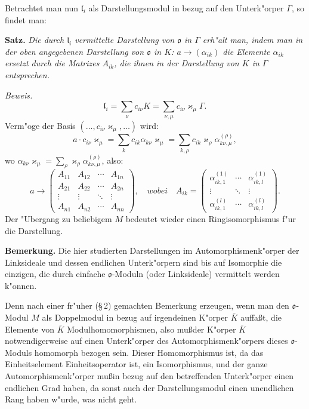 \documentclass[12pt,a4paper]{article}
\theoremstyle{plain}
\begin{document}
Betrachtet man nun $\mathfrak{l}_i$ als Darstellungsmodul in bezug auf den Unterk"orper $\Gamma$, so findet man:

\noindent\textbf{Satz.}
\textit{Die durch $\mathfrak{l}_i$ vermittelte Darstellung von $\mathfrak{o}$ in $\Gamma$ erh"alt man, indem man in der oben angegebenen Darstellung von $\mathfrak{o}$ in $K$: $a \to (\alpha_{ik})$ die Elemente $\alpha_{ik}$ ersetzt durch die Matrizes $A_{ik}$, die ihnen in der Darstellung von $K$ in $\Gamma$ entsprechen.}

\noindent\textit{Beweis.}
\[
\mathfrak{l}_i = \sum_\nu c_{i\nu}K = \sum_{\nu,\mu} c_{i\nu}\varkappa_\mu\Gamma.
\]
Verm"oge der Basis $(\ldots,c_{i\nu}\varkappa_\mu,\ldots)$ wird:
\[
a \cdot c_{i\nu}\varkappa_\mu = \sum_k c_{ik}\alpha_{k\nu}\varkappa_\mu
= \sum_{k,\rho} c_{ik}\varkappa_\rho\alpha^{(\rho)}_{k\nu,\mu},
\]
wo $\alpha_{k\nu}\varkappa_\mu = \sum_\rho \varkappa_\rho\alpha^{(\rho)}_{k\nu,\mu}$, also:
\[
a \to \begin{pmatrix}
A_{11} & A_{12} & \cdots & A_{1n} \\
A_{21} & A_{22} & \cdots & A_{2n} \\
\vdots & \vdots & \ddots & \vdots \\
A_{n1} & A_{n2} & \cdots & A_{nn}
\end{pmatrix},
\quad{wobei}\quad
A_{ik} = \begin{pmatrix}
\alpha^{(1)}_{ik,1} & \cdots & \alpha^{(1)}_{ik,l} \\
\vdots & \ddots & \vdots \\
\alpha^{(l)}_{ik,1} & \cdots & \alpha^{(l)}_{ik,l}
\end{pmatrix}.
\]
Der "Ubergang zu beliebigem $M$ bedeutet wieder einen Ringisomorphismus f"ur die Darstellung.

\medskip\noindent\textbf{Bemerkung.}
Die hier studierten Darstellungen im Automorphismenk"orper der Linksideale und dessen endlichen Unterk"orpern sind bis auf Isomorphie die einzigen, die durch einfache $\mathfrak{o}$-Moduln (oder Linksideale) vermittelt werden k"onnen.

Denn nach einer fr"uher (\S\,2) gemachten Bemerkung erzeugen, wenn man den $\mathfrak{o}$-Modul $M$ als Doppelmodul in bezug auf irgendeinen K"orper $\bar{K}$ auffa\ss t, die Elemente von $\bar{K}$ Modulhomomorphismen, also mu\ss der K"orper $\bar{K}$ notwendigerweise auf einen Unterk"orper des Automorphismenk"orpers dieses $\mathfrak{o}$-Moduls homomorph bezogen sein. Dieser Homomorphismus ist, da das Einheitselement Einheitsoperator ist, ein Isomorphismus, und der ganze Automorphismenk"orper mu\ss in bezug auf den betreffenden Unterk"orper einen endlichen Grad haben, da sonst auch der Darstellungsmodul einen unendlichen Rang haben w"urde, was nicht geht.
\end{document}
